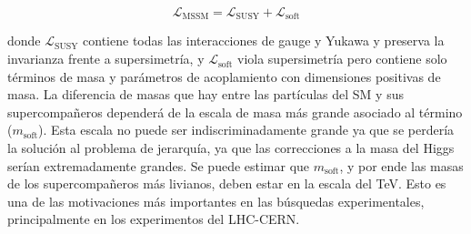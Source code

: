 \begin{equation}
	\mathcal{L}_{\text{MSSM}} = \mathcal{L}_{\text{SUSY}} + \mathcal{L}_{\text{soft}} 
	\label{eq:l_susy}
\end{equation}

\noindent
donde $\mathcal{L}_{\text{SUSY}}$ contiene todas las interacciones de gauge y Yukawa y preserva la invarianza frente a supersimetría, y $\mathcal{L}_{\text{soft}}$ viola supersimetría pero contiene solo términos de masa y parámetros de acoplamiento con dimensiones positivas de masa. La diferencia de masas que hay entre las partículas del SM y sus supercompañeros dependerá de la escala de masa más grande asociado al término  ($m_{\text{soft}}$). Esta escala no puede ser indiscriminadamente grande ya que se perdería la solución al problema de jerarquía, ya que las correcciones a la masa del Higgs serían extremadamente grandes. Se puede estimar 
que $m_{\text{soft}}$, y por ende las masas de los supercompañeros más livianos, deben estar en la escala del TeV. Esto es una de las motivaciones más importantes en las búsquedas experimentales, principalmente en los experimentos del LHC-CERN.




